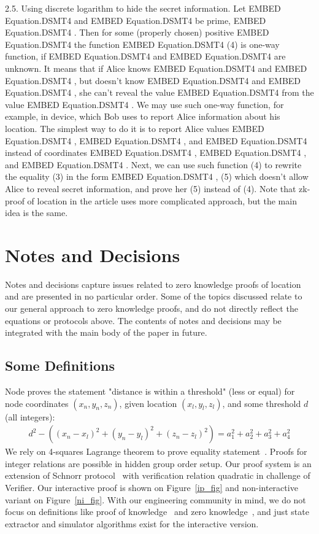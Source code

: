 \documentclass{article}
\begin{document}
2.5. Using discrete logarithm to hide the secret information.
Let  EMBED Equation.DSMT4   and  EMBED Equation.DSMT4   be prime,  EMBED Equation.DSMT4  . Then for some (properly chosen) positive  EMBED Equation.DSMT4   the function
 EMBED Equation.DSMT4                                                          (4)
is one-way function, if  EMBED Equation.DSMT4   and  EMBED Equation.DSMT4   are unknown.
It means that if Alice knows  EMBED Equation.DSMT4   and  EMBED Equation.DSMT4  , but doesn’t know  EMBED Equation.DSMT4   and  EMBED Equation.DSMT4  ,
she can’t reveal the value  EMBED Equation.DSMT4   from the value  EMBED Equation.DSMT4  .
We may use such one-way function, for example, in device, which Bob uses to report Alice information about his location.
The simplest way to do it is to report Alice values  EMBED Equation.DSMT4  ,  EMBED Equation.DSMT4  , and  EMBED Equation.DSMT4   instead of coordinates  EMBED Equation.DSMT4  ,
EMBED Equation.DSMT4  , and  EMBED Equation.DSMT4  .
Next, we can use such function (4) to rewrite the equality (3) in the form
 EMBED Equation.DSMT4  ,                                    (5)
which doesn’t allow Alice to reveal secret information, and prove her (5) instead of (4).
Note that zk-proof of location in the article uses more complicated approach, but the main idea is the same.


\section{Notes and Decisions}

Notes and decisions capture issues related to zero knowledge proofs of location and are presented in no particular order.
Some of the topics discussed relate to our general approach to zero knowledge proofs, and do not directly reflect the equations or protocols above.
The contents of notes and decisions may be integrated with the main body of the paper in future. 


\subsection{Some Definitions}
\label{sect-definitions}
Node proves the statement "distance is within a threshold" (less or equal)
for node coordinates $(x_n, y_n, z_n)$,
given location $(x_l, y_l, z_l)$,
and some threshold $d$ (all integers):
\begin{gather}
\label{eq-distn-cp}
  d^2 - ((x_n - x_l)^2 + (y_n - y_l)^2 + (z_n - z_l)^2) = a_1^2 + a_2^2 + a_3^2 + a_4^2
\end{gather}
We rely on 4-squares Lagrange theorem to prove equality statement~\cite{Lipmaa03}.
Proofs for integer relations are possible in hidden group order setup.
Our proof system is an extension of Schnorr protocol~\cite{Schnorr91}
with verification relation quadratic in challenge of Verifier.
Our interactive proof is shown on Figure~\ref{ip_fig}
and non-interactive variant on Figure~\ref{ni_fig}.
With our engineering community in mind, we do not focus on definitions like
proof of knowledge~\cite{BellarePoK}
and zero knowledge~\cite{Goldwasser85,GMW},
and just state extractor and simulator algorithms exist for the interactive version.
\end{document}
